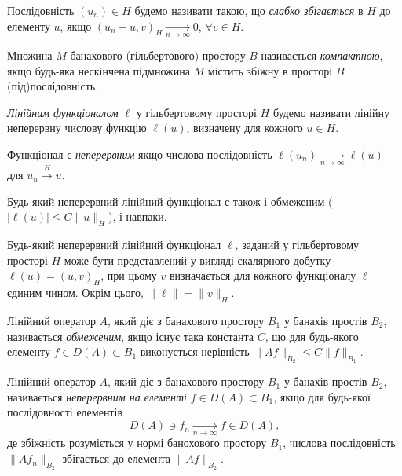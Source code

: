 \begin{definition}
    Послідовність $(u_n) \in H$ будемо називати такою, що \emph{слабко збігається} в $H$ до елементу $u$, якщо $(u_n - u, v)_H \xrightarrow[n \to \infty]{} 0$, $\forall v \in H$. 
\end{definition}

\begin{definition}
    Множина $M$ банахового (гільбертового) простору $B$ називається \emph{компактною}, якщо будь-яка нескінчена підмножина $M$ містить збіжну в просторі $B$ (під)послідовність.
\end{definition}

\begin{definition}
    \emph{Лінійним функціоналом} $\ell$ у гільбертовому просторі $H$ будемо називати лінійну неперервну числову функцію $\ell(u)$, визначену для кожного $u \in H$.
\end{definition}

\begin{definition}
    Функціонал є \emph{неперервним} якщо числова послідовність $\ell(u_n) \xrightarrow[n \to \infty]{} \ell(u)$ для $u_n \xrightarrow{H} u$.
\end{definition}

\begin{proposition}
    Будь-який неперервний лінійний функціонал є також і обмеженим ($|\ell(u)| \le C \|u\|_H$), і навпаки.
\end{proposition}

\begin{theorem}
    Будь-який неперервний лінійний функціонал $\ell$, заданий у гільбертовому просторі $H$ може бути представлений у вигляді скалярного добутку $\ell(u) = (u,v)_H$, при цьому $v$ визначається для кожного функціоналу $\ell$ єдиним чином. Окрім цього, $\|\ell\| = \|v\|_H$.
\end{theorem}

\begin{definition}
    Лінійний оператор $A$, який діє з банахового простору $B_1$ у банахів простів $B_2$, називається \emph{обмеженим}, якщо існує така константа $C$, що для будь-якого елементу $f \in D(A) \subset B_1$ виконується нерівність $\|A f\|_{B_2} \le C \|f\|_{B_1}$.
\end{definition}

\begin{definition}
    Лінійний оператор $A$, який діє з банахового простору $B_1$ у банахів простів $B_2$, називається \emph{неперервним на елементі} $f \in D(A) \subset B_1$, якщо для будь-якої послідовності елементів
    \begin{equation*}
        D(A) \ni f_n \xrightarrow[n \to \infty]{} f \in D(A),
    \end{equation*}
    де збіжність розуміється у нормі банохового простору $B_1$, числова послідовність $\|Af_n\|_{B_2}$ збігається до елемента $\|Af\|_{B_2}$.
\end{definition}

